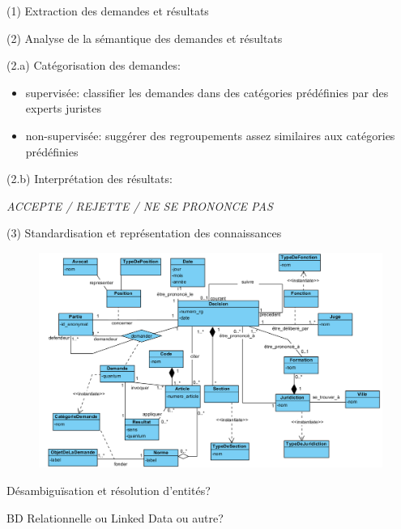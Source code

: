 \documentclass[newPxFont,pagenumber]{beamer}
\begin{document}
\begin{frame}{(1) Extraction des demandes et résultats}

\end{frame}

\begin{frame}{(2) Analyse de la sémantique des demandes et résultats}

(2.a) Catégorisation des demandes:
\begin{itemize}
\item supervisée: classifier les demandes dans des catégories prédéfinies par des experts juristes
\item non-supervisée: suggérer des regroupements assez similaires aux catégories prédéfinies
\end{itemize}


(2.b) Interprétation des résultats: 

\textit{ACCEPTE / REJETTE / NE SE PRONONCE PAS}


\end{frame}

\begin{frame}{(3) Standardisation et représentation des connaissances}
\begin{figure}
\includegraphics[width=0.7\paperwidth]{class-diagram.png}
\end{figure}

Désambiguïsation et résolution d'entités?

BD Relationnelle ou Linked Data ou autre?
\end{frame}
\end{document}
